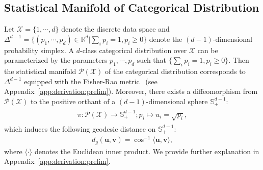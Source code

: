 \subsection{Statistical Manifold of Categorical Distribution}
Let $\mathcal{X}=\{1,\cdots,d\}$ denote the discrete data space and $\Delta^{d-1}=\{(p_1,\cdots, p_d)\in\mathbb{R}^d|\sum_i p_i=1, p_i\geq0\}$ denote the $(d-1)$-dimensional probability simplex.
A $d$-class categorical distribution over $\mathcal{X}$ can be parameterized by the parameters $p_1,\cdots,p_d$ such that $\{\sum_i p_i=1, p_i\geq0\}$. 
Then the statistical manifold $\mathcal{P}(\mathcal{X})$ of the categorical distribution corresponds to $\Delta^{d-1}$ equipped with the Fisher-Rao metric~\citep{rao1992information,amari2016information} (see Appendix~\ref{app:derivation:prelim}).
Moreover, there exists a diffeomorphism from $\mathcal{P}(\mathcal{X})$ to the positive orthant of a $(d-1)$-dimensional sphere $\mathbb{S}^{d-1}_{+}$:
\begin{align}
\begin{split}
    \pi: \mathcal{P}(\mathcal{X}) \rightarrow \mathbb{S}^{d-1}_{+} ; p_i\mapsto u_i=\sqrt{p_i},
\end{split}
\label{eq:diffeomorphism}
\end{align}
which induces the following geodesic distance on $\mathbb{S}^{d-1}_{+}$:
\begin{align}
    d_g(\bm{u},\bm{v}) = \cos^{-1}\langle\bm{u}, \bm{v}\rangle,
\end{align}
where $\langle\cdot\rangle$ denotes the Euclidean inner product.
We provide further explanation in Appendix~\ref{app:derivation:prelim}.


